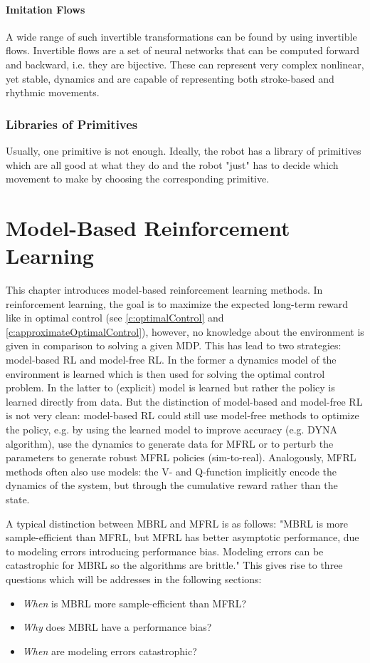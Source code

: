 			\subsubsection{Imitation Flows}
				A wide range of such invertible transformations can be found by using invertible flows. Invertible flows are a set of neural networks that can be computed forward and backward, i.e. they are bijective. These can represent very complex nonlinear, yet stable, dynamics and are capable of representing both stroke-based and rhythmic movements.

		\subsection{Libraries of Primitives}
			Usually, one primitive is not enough. Ideally, the robot has a library of primitives which are all good at what they do and the robot "just" has to decide which movement to make by choosing the corresponding primitive.

\chapter{Model-Based Reinforcement Learning}
	\label{c:modelBasedRL}

	This chapter introduces model-based reinforcement learning methods. In reinforcement learning, the goal is to maximize the expected long-term reward like in optimal control (see \autoref{c:optimalControl} and \ref{c:approximateOptimalControl}), however, no knowledge about the environment is given in comparison to solving a given MDP. This has lead to two strategies: model-based RL and model-free RL. In the former a dynamics model of the environment is learned which is then used for solving the optimal control problem. In the latter to (explicit) model is learned but rather the policy is learned directly from data. But the distinction of model-based and model-free RL is not very clean: model-based RL could still use model-free methods to optimize the policy, e.g. by using the learned model to improve accuracy (e.g. DYNA algorithm), use the dynamics to generate data for MFRL or to perturb the parameters to generate robust MFRL policies (sim-to-real). Analogously, MFRL methods often also use models: the V- and Q-function implicitly encode the dynamics of the system, but through the cumulative reward rather than the state.

	A typical distinction between MBRL and MFRL is as follows: "MBRL is more sample-efficient than MFRL, but MFRL has better asymptotic performance, due to modeling errors introducing performance bias. Modeling errors can be catastrophic for MBRL so the algorithms are brittle." This gives rise to three questions which will be addresses in the following sections:
	\begin{itemize}
		\item \emph{When} is MBRL more sample-efficient than MFRL?
		\item \emph{Why} does MBRL have a performance bias?
		\item \emph{When} are modeling errors catastrophic?
	\end{itemize}

